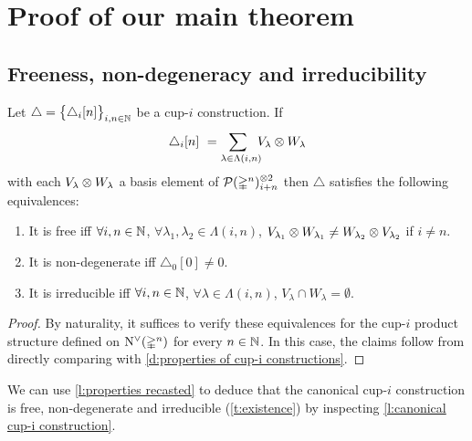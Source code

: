 
\section{Proof of our main theorem} \label{s:proof}

\subsection{Freeness, non-degeneracy and irreducibility} \label{ss:free non-deg irreducible}

\begin{lemma} \label{l:properties recasted}
	Let $\triangle = \big\{ \triangle_i [n] \big\}_{i,n\in\mathbb{N}}$ be a cup-$i$ construction.
	If
	\[
	\triangle_i [n] \ =
	\sum_{\lambda \in \Lambda(i,n) \kern-5pt} V_\lambda \otimes W_\lambda
	\]
	with each $V_\lambda \otimes W_\lambda$ a basis element of $\mathcal{P}(\mathbb{\Delta}^n)^{\otimes 2}_{i+n}$ then $\triangle$ satisfies the following equivalences:
	\begin{enumerate}
		\item It is free iff \kern 1pt
		$\forall i,n \in \mathbb{N}$, $\forall \lambda_1, \lambda_2 \in \Lambda(i,n)$, $V_{\lambda_1} \otimes W_{\lambda_1} \neq W_{\lambda_2} \otimes V_{\lambda_2}$ if $i \neq n$.
		\item It is non-degenerate iff
		$\triangle_0 [0] \neq 0$.
		\item It is irreducible iff \kern 1pt
		$\forall i,n \in \mathbb{N}$, $\forall \lambda \in \Lambda(i,n)$, $V_\lambda \cap W_\lambda = \emptyset$.
	\end{enumerate}
\end{lemma}

\begin{proof}
	By naturality, it suffices to verify these equivalences for the cup-$i$ product structure defined on $\operatorname{N^{\vee}}(\mathbb{\Delta}^n)$ for every $n \in \mathbb{N}$.
	In this case, the claims follow from directly comparing with \cref{d:properties of cup-i constructions}.
\end{proof}

We can use \cref{l:properties recasted} to deduce that the canonical cup-$i$ construction is free, non-degenerate and irreducible (\cref{t:existence}) by inspecting \cref{l:canonical cup-i construction}.


